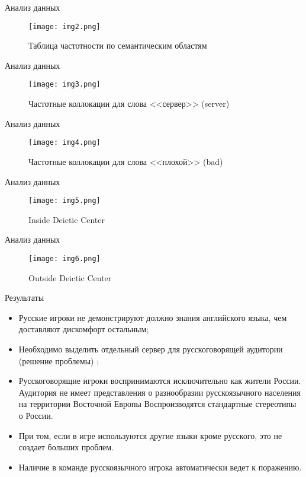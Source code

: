 \documentclass{beamer}
\begin{document}
\begin{frame}{Анализ данных}
	\begin{figure}
		\caption{Таблица частотности по семантическим областям}
		\texttt{[image: img2.png]}
	\end{figure}
\end{frame}

\begin{frame}{Анализ данных}
	\begin{figure}
		\caption{Частотные коллокации для слова <<сервер>> (server)}
		\texttt{[image: img3.png]}
	\end{figure}
\end{frame}

\begin{frame}{Анализ данных}
	\begin{figure}
		\caption{Частотные коллокации для слова <<плохой>> (bad)}
		\texttt{[image: img4.png]}
	\end{figure}
\end{frame}

\begin{frame}{Анализ данных}
	\begin{figure}
		\caption{Inside Deictic Center}
		\texttt{[image: img5.png]}
	\end{figure}
\end{frame}

\begin{frame}{Анализ данных}
	\begin{figure}
		\caption{Outside Deictic Center}
		\texttt{[image: img6.png]}
	\end{figure}
\end{frame}


\begin{frame}{Результаты}
\begin{itemize}
	\item Русские игроки не демонстрируют должно знания английского языка, чем доставляют дискомфорт остальным;
	\item Необходимо выделить отдельный сервер для русскоговорящей аудитории (решение проблемы) ;
	\item Русскоговорящие игроки воспринимаются исключительно как жители России. Аудитория не имеет представления о разнообразии русскоязычного населения на территории Восточной Европы  Воспроизводятся стандартные стереотипы о России.
	\item  При том, если в игре используются другие языки кроме русского, это не создает больших проблем. 
	\item Наличие в команде русскоязычного игрока автоматически ведет к поражению. 
	
\end{itemize}
\end{frame}
\end{document}
